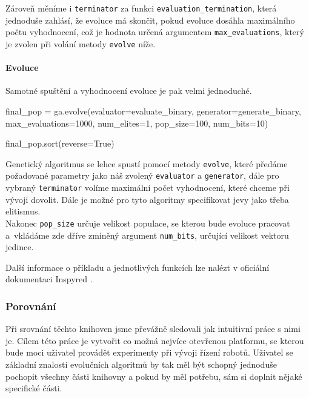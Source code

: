 Zároveň měníme i \texttt{terminator} za funkci \texttt{evaluation\_termination},
která jednoduše zahlásí, že evoluce má skončit, pokud evoluce dosáhla
maximálního počtu vyhodnocení, což je hodnota určená argumentem
\texttt{max\_evaluations}, který je zvolen při volání metody \texttt{evolve}
níže.

\paragraph{Evoluce}
Samotné spuštění a vyhodnocení evoluce je pak velmi jednoduché.

\begin{code}
final_pop = ga.evolve(evaluator=evaluate_binary,
                      generator=generate_binary,
                      max_evaluations=1000,
                      num_elites=1,
                      pop_size=100,
                      num_bits=10)

final_pop.sort(reverse=True)
\end{code}

Genetický algoritmus se lehce spustí pomocí metody \texttt{evolve}, které předáme
požadované parametry jako náš zvolený \texttt{evaluator} a \texttt{generator},
dále pro vybraný \texttt{terminator} volíme maximální počet vyhodnocení, které
chceme při vývoji dovolit. Dále je možné pro tyto algoritmy specifikovat jevy
jako třeba elitismus. \\Nakonec \texttt{pop\_size} určuje velikost populace, se
kterou bude evoluce pracovat a~vkládáme zde dříve zmíněný argument
\texttt{num\_bits}, určující velikost vektoru jedince. 

Další informace o příkladu a jednotlivých funkcích lze nalézt v oficiální
dokumentaci Inspyred \citep{InspyredDocs}.


\subsubsection{Porovnání} \label{GA - Porovnání}
Při srovnání těchto knihoven jsme převážně sledovali jak intuitivní práce s
nimi je. Cílem této práce je vytvořit co možná nejvíce otevřenou platformu, se
kterou bude moci uživatel provádět experimenty při vývoji řízení robotů.
Uživatel se základní znalostí evolučních algoritmů by tak měl být schopný
jednoduše pochopit všechny části knihovny a pokud by měl potřebu, sám si
doplnit nějaké specifické části. 

